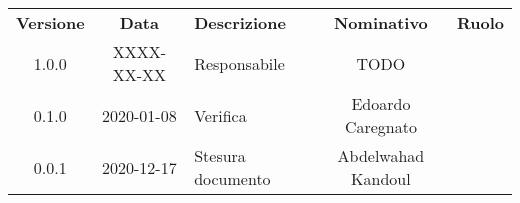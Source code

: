 {
    \renewcommand{\arraystretch}{1.5}
    \centering
    \begin{longtable}{ c c  C{4cm}  c  c }
        \rowcolor{\primaryColor}
        \textcolor{\secondaryColor}{
        \textbf{Versione}}     & \textcolor{\secondaryColor}{\textbf{Data}}       & \textcolor{\secondaryColor}
        {\textbf{Descrizione}} & \textcolor{\secondaryColor}{\textbf{Nominativo}} & \textcolor{\secondaryColor}{\textbf{Ruolo}}                          \\


        1.0.0                  & XXXX-XX-XX                                       & Responsabile                                & TODO & \responsabile{} \\
        0.1.0                 & 2020-01-08                                      & Verifica                                   	 & Edoardo Caregnato & \verificatore{} \\
        0.0.1                  & 2020-12-17						 & Stesura documento 		& Abdelwahad Kandoul & \redattore{}    \\
    \end{longtable}
}